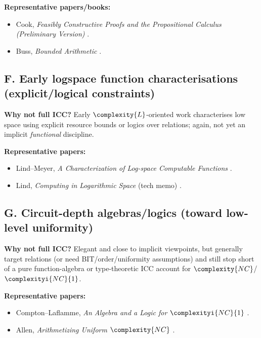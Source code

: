 \noindent\textbf{Representative papers/books:}
\begin{itemize}
  \item Cook, \emph{Feasibly Constructive Proofs and the Propositional Calculus (Preliminary Version)} \cite{Cook1975}.
  \item Buss, \emph{Bounded Arithmetic} \cite{Buss1986}.
\end{itemize}

\subsection*{F. Early logspace function characterisations (explicit/logical constraints)}
\textbf{Why not full ICC?} Early \(\complexity{L}\)-oriented work characterises low space using explicit resource
bounds or logics over relations; again, not yet an implicit \emph{functional} discipline.

\noindent\textbf{Representative papers:}
\begin{itemize}
  \item Lind--Meyer, \emph{A Characterization of Log-space Computable Functions} \cite{LindMeyer1973}.
  \item Lind, \emph{Computing in Logarithmic Space} (tech memo) \cite{Lind1974}.
\end{itemize}

\subsection*{G. Circuit-depth algebras/logics (toward low-level uniformity)}
\textbf{Why not full ICC?} Elegant and close to implicit viewpoints, but generally target relations
(or need BIT/order/uniformity assumptions) and still stop short of a pure function-algebra
or type-theoretic ICC account for \(\complexity{NC}\)/\(\complexityi{NC}{1}\).

\noindent\textbf{Representative papers:}
\begin{itemize}
  \item Compton--Laflamme, \emph{An Algebra and a Logic for \(\complexityi{NC}{1}\)} \cite{ComptonLaflamme1990}.
  \item Allen, \emph{Arithmetizing Uniform \(\complexity{NC}\)} \cite{Allen1991}.
\end{itemize}

